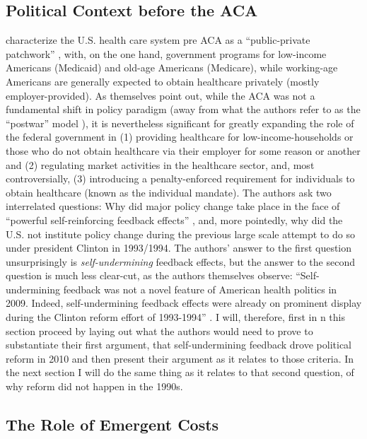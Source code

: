 \documentclass[11pt]{article}
\begin{document}

\subsection*{Political Context before the ACA}

\textcite[][]{Jacobs2014} characterize the U.S. health care system pre ACA as a \enquote{public-private patchwork} , with, on the one hand, government programs for low-income Americans (Medicaid) and old-age Americans (Medicare), while working-age Americans are generally expected to obtain healthcare privately (mostly employer-provided). As \textcite[][]{Jacobs2014} themselves point out, while the ACA was not a fundamental shift in policy paradigm (away from what the authors refer to as the \enquote{postwar} model ), it is nevertheless significant for greatly expanding the role of the federal government in (1) providing healthcare for low-income-households or those who do not obtain healthcare via their employer for some reason or another and (2) regulating market activities in the healthcare sector, and, most controversially, (3) introducing a penalty-enforced requirement for individuals to obtain healthcare (known as the individual mandate). The authors ask two interrelated questions: Why did major policy change take place in the face of \enquote{powerful self-reinforcing feedback effects} \parencite[][p. 451]{Jacobs2014}, and, more pointedly, why did the U.S. not institute policy change during the previous large scale attempt to do so under president Clinton in 1993/1994. The authors' answer to the first question unsurprisingly is \textit{self-undermining} feedback effects, but the answer to the second question is much less clear-cut, as the authors themselves observe: \enquote{Self-undermining feedback was not a novel feature of American health politics in 2009. Indeed, self-undermining feedback effects were already on prominent display during the Clinton reform effort of 1993-1994} \parencite[][p. 451]{Jacobs2014}. I will, therefore, first in n this section proceed by laying out what the authors would need to prove to substantiate their first argument, that self-undermining feedback drove political reform in 2010 and then present their argument as it relates to those criteria. In the next section I will do the same thing as it relates to that second question, of why reform did not happen in the 1990s.

\subsection*{The Role of Emergent Costs}
\end{document}
